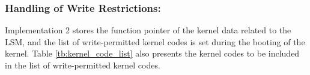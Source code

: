 \begin{table}[t]
  \centering
    \caption{
      Protected kernel data and write-permitted kernel code of Implementation 2
    }
\label{tb:kernel_code_list}
\end{table}

\subsubsection{Handling of Write Restrictions:} 

Implementation 2 stores the function pointer of the kernel data related to
the LSM, and the list of write-permitted kernel codes is set during the booting of the kernel.
Table \ref{tb:kernel_code_list} also presents the kernel codes to be included in
the list of write-permitted kernel codes.

